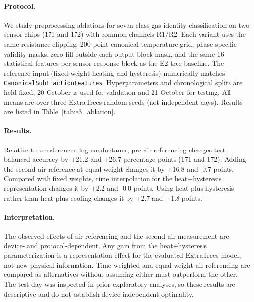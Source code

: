 \paragraph{Protocol.} We study preprocessing ablations for seven-class gas identity
classification on two sensor chips (171 and 172) with common channels R1/R2.
Each variant uses the same resistance clipping, 200-point canonical temperature grid,
phase-specific validity masks, zero fill outside each output block mask, and
the same 16 statistical features per sensor-response block as the E2 tree baseline.
The reference input (fixed-weight heating and hysteresis) numerically matches
\texttt{CanonicalSubtractionFeatures}. Hyperparameters and chronological splits
are held fixed; 20 October is used for validation and 21 October for testing.
All means are over three ExtraTrees random seeds (not independent days).
Results are listed in Table~\ref{tab:e3_ablation}.

\paragraph{Results.} Relative to unreferenced log-conductance, pre-air
referencing changes test balanced accuracy by +21.2 and +26.7
percentage points (171 and 172). Adding the second air reference at equal
weight changes it by +16.8 and -0.7 points.
Compared with fixed weights, time interpolation for the heat+hysteresis
representation changes it by +2.2 and -0.0 points.
Using heat plus hysteresis rather than heat plus cooling changes it
by +2.7 and +1.8 points.

\paragraph{Interpretation.} The observed effects of air referencing and
the second air measurement are device- and protocol-dependent.
Any gain from the heat+hysteresis parameterization is a representation
effect for the evaluated ExtraTrees model, not new physical information.
Time-weighted and equal-weight air referencing are compared as alternatives
without assuming either must outperform the other.
The test day was inspected in prior exploratory analyses, so these results
are descriptive and do not establish device-independent optimality.
